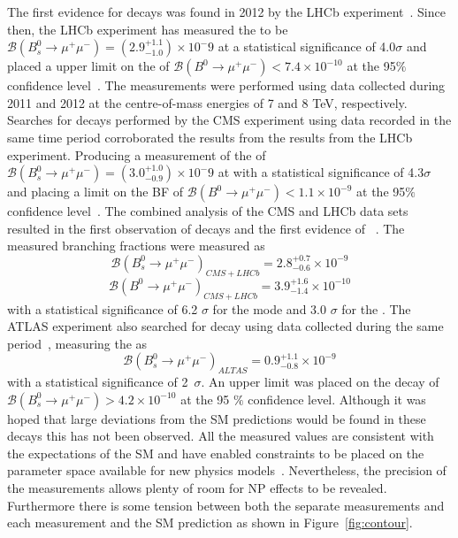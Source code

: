 {{The first evidence for \bsmumu decays was found in 2012 by the LHCb experiment~\cite{Aaij:2012nna}. Since then,
the LHCb experiment has measured the \bsmumu \BF to be $\mathcal{B}(B^{0}_{s} \to \mu^+ \mu^-) = (2.9^{+1.1}_{-1.0})\times 10^-9$ at a statistical significance of 4.0$\sigma$ and placed a upper limit on the \bdmumu \BF of $\mathcal{B}(B^{0} \to \mu^+ \mu^-) < 7.4 \times 10^{-10}$ at the 95$\%$ confidence level~\cite{Aaij:2013aka}. The measurements were performed using data collected during 2011 and 2012 at the centre-of-mass energies of 7 and 8 TeV, respectively. Searches for \bmumu decays performed by the CMS experiment using data recorded in the same time period corroborated the results from the results from the LHCb experiment. Producing a measurement of the \bsmumu \BF of $\mathcal{B}(B^{0}_{s} \to \mu^+ \mu^-) = (3.0^{+1.0}_{-0.9})\times 10^-9$ at with a statistical significance of 4.3$\sigma$ and placing a limit on the \bdmumu BF of $\mathcal{B}(B^{0} \to \mu^+ \mu^-) < 1.1 \times 10^{-9}$ at the 95$\%$ confidence level~\cite{Chatrchyan:2013bka}. 
The combined analysis of the CMS and LHCb data sets resulted in the first observation of \bsmumu decays and the first evidence of \bdmumu~\cite{CMS:2014xfa}. The measured branching fractions were measured as
\begin{equation}
\mathcal{B}(B^{0}_{s} \to \mu^+ \mu^-)_{CMS + LHCb}  = 2.8^{+0.7}_{-0.6} \times 10^{-9}
\end{equation}
\begin{equation}
\mathcal{B}(B^{0} \to \mu^+ \mu^-)_{CMS + LHCb}  = 3.9^{+1.6}_{-1.4} \times 10^{-10}
\end{equation}
with a statistical significance of 6.2 $\sigma$ for the \bs mode and 3.0 $\sigma$ for the \bd. The ATLAS experiment also searched for \bmumu decay using data collected during the same period~\cite{Aaboud:2016ire}, measuring the \bsmumu \BF as 
\begin{equation}
\mathcal{B}(B^{0}_{s} \to \mu^+ \mu^-)_{ALTAS}  = 0.9^{+1.1}_{-0.8} \times 10^{-9}
\end{equation}
with a statistical significance of 2~$\sigma$. An upper limit was placed on the \bdmumu decay of $\mathcal{B}(B^{0}_{s} \to \mu^+ \mu^-) >4.2 \times 10^{-10}$ at the 95 $\%$ confidence level.
Although it was hoped that large deviations from the SM predictions would be found in these decays this has not been observed. 
All the measured values are consistent with the expectations of the SM and have enabled constraints to be placed on the parameter space available for new physics models~\cite{}. Nevertheless, the precision of the measurements allows plenty of room for NP effects to be revealed. Furthermore there is some tension between both the separate measurements and each measurement and the SM prediction as shown in Figure~\ref{fig:contour}. 
}}
